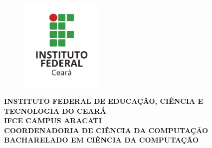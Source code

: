 \thispagestyle{empty}
\vfill
\begin{center}

\begin{figure}[t]
\centering
\includegraphics[width=4cm]{figuras/ifce-ceara.png}%
\end{figure}
\vspace{0.5 cm}
{\normalsize\bfseries INSTITUTO FEDERAL DE EDUCAÇÃO, CIÊNCIA E TECNOLOGIA DO CEARÁ} \\
{\normalsize\bfseries IFCE CAMPUS ARACATI} \\
{\normalsize\bfseries COORDENADORIA DE CIÊNCIA DA COMPUTAÇÃO}  \\ 
{\normalsize\bfseries BACHARELADO EM CIÊNCIA DA COMPUTAÇÃO}  \\ 

\vspace*{1in}
\begin{large} \bfseries \imprimirautor \end{large}\\[0.4in]

\vspace*{4cm}
\noindent \\
\large\bfseries \imprimirtitulo \\
\vfill
\normalsize\bfseries{\imprimirlocal\\\imprimirdata}

\end{center}
\normalsize